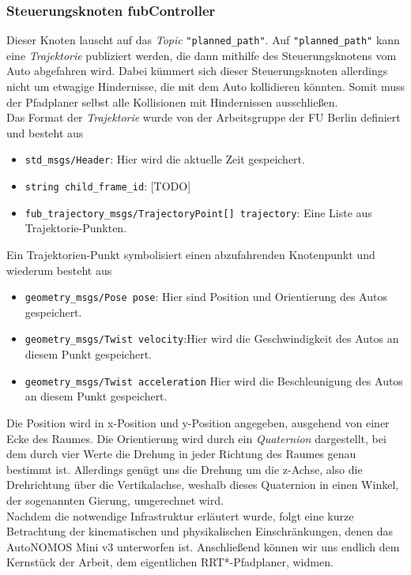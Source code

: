 \subsubsection{Steuerungsknoten fubController}
Dieser Knoten lauscht auf das \textit{Topic} \verb|"planned_path"|. Auf \verb|"planned_path"| kann eine \textit{Trajektorie} publiziert werden, die dann mithilfe des Steuerungsknotens vom Auto abgefahren wird. Dabei kümmert sich dieser Steuerungsknoten allerdings nicht um etwagige Hindernisse, die mit dem Auto kollidieren könnten. Somit muss der Pfadplaner selbst alle Kollisionen mit Hindernissen ausschließen. \\
Das Format der \textit{Trajektorie} wurde von der Arbeitsgruppe der FU Berlin definiert und besteht aus
\begin{itemize}
\item \verb|std_msgs/Header|: Hier wird die aktuelle Zeit gespeichert.
\item \verb|string child_frame_id|: [TODO]
\item \verb|fub_trajectory_msgs/TrajectoryPoint[] trajectory|: Eine Liste aus Trajektorie-Punkten.
\end{itemize}
Ein Trajektorien-Punkt symbolisiert einen abzufahrenden Knotenpunkt und wiederum besteht aus
\begin{itemize}
\item \verb|geometry_msgs/Pose pose|: Hier sind Position und Orientierung des Autos gespeichert.
\item \verb|geometry_msgs/Twist velocity|:Hier wird die Geschwindigkeit des Autos an diesem Punkt gespeichert.
\item \verb|geometry_msgs/Twist acceleration| Hier wird die Beschleunigung des Autos an diesem Punkt gespeichert.
\end{itemize}
Die Position wird in x-Position und y-Position angegeben, ausgehend von einer Ecke des Raumes. Die Orientierung wird durch ein \textit{Quaternion} dargestellt, bei dem durch vier Werte die Drehung in jeder Richtung des Raumes genau bestimmt ist. Allerdings genügt uns die Drehung um die z-Achse, also die Drehrichtung über die Vertikalachse, weshalb dieses Quaternion in einen Winkel, der sogenannten Gierung, umgerechnet wird.
\\
Nachdem die notwendige Infrastruktur erläutert wurde, folgt eine kurze Betrachtung der kinematischen und physikalischen Einschränkungen, denen das AutoNOMOS Mini v3 unterworfen ist. Anschließend können wir uns endlich dem Kernstück der Arbeit, dem eigentlichen RRT*-Pfadplaner, widmen.

